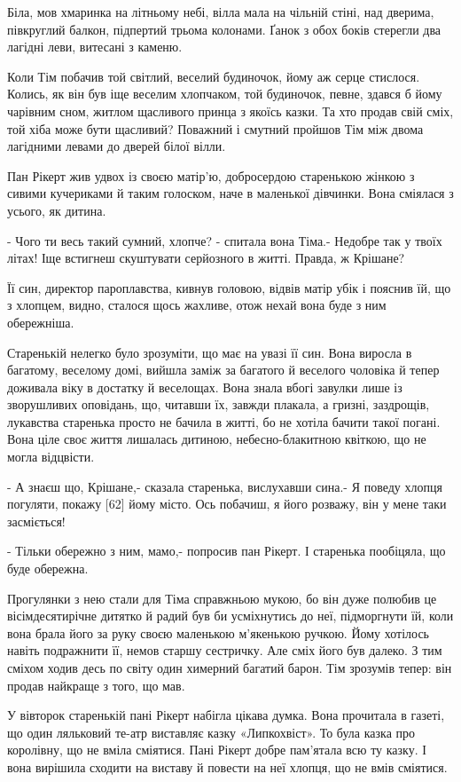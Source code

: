 Біла, мов хмаринка на літньому небі, вілла мала на чільній стіні, над дверима, півкруглий балкон, підпертий трьома колонами. Ґанок з обох боків стерегли два лагідні леви, витесані з каменю.

Коли Тім побачив той світлий, веселий будиночок, йому аж серце стислося. Колись, як він був іще веселим хлопчаком, той будиночок, певне, здався б йому чарівним сном, житлом щасливого принца з якоїсь казки. Та хто продав свій сміх, той хіба може бути щасливий? Поважний і смутний пройшов Тім між двома лагідними левами до дверей білої вілли.

Пан Рікерт жив удвох із своєю матір'ю, добросердою старенькою жінкою з сивими кучериками й таким голоском, наче в маленької дівчинки. Вона сміялася з усього, як дитина.

- Чого ти весь такий сумний, хлопче? - спитала вона Тіма.- Недобре так у твоїх літах! Іще встигнеш скуштувати серйозного в житті. Правда, ж Крішане?

Її син, директор пароплавства, кивнув головою, відвів матір убік і пояснив їй, що з хлопцем, видно, сталося щось жахливе, отож нехай вона буде з ним обережніша.

Старенькій нелегко було зрозуміти, що має на увазі її син. Вона виросла в багатому, веселому домі, вийшла заміж за багатого й веселого чоловіка й тепер доживала віку в достатку й веселощах. Вона знала вбогі завулки лише із зворушливих оповідань, що, читавши їх, завжди плакала, а гризні, заздрощів, лукавства старенька просто не бачила в житті, бо не хотіла бачити такої погані. Вона ціле своє життя лишалась дитиною, небесно-блакитною квіткою, що не могла відцвісти.

- А знаєш що, Крішане,- сказала старенька, вислухавши сина.- Я поведу хлопця погуляти, покажу [62] йому місто. Ось побачиш, я його розважу, він у мене таки засміється!

- Тільки обережно з ним, мамо,- попросив пан Рікерт. І старенька пообіцяла, що буде обережна.

Прогулянки з нею стали для Тіма справжньою мукою, бо він дуже полюбив це вісімдесятирічне дитятко й радий був би усміхнутись до неї, підморгнути їй, коли вона брала його за руку своєю маленькою м'якенькою ручкою. Йому хотілось навіть подражнити її, немов старшу сестричку. Але сміх його був далеко. З тим сміхом ходив десь по світу один химерний багатий барон. Тім зрозумів тепер: він продав найкраще з того, що мав.

У вівторок старенькій пані Рікерт набігла цікава думка. Вона прочитала в газеті, що один ляльковий те-атр виставляє казку «Липкохвіст». То була казка про королівну, що не вміла сміятися. Пані Рікерт добре пам'ятала всю ту казку. І вона вирішила сходити на виставу й повести на неї хлопця, що не вмів сміятися.


